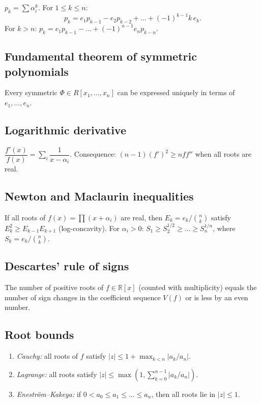 $p_k=\sum\alpha_i^k$. For $1\le k\le n$:
$$p_k=e_1 p_{k-1}-e_2 p_{k-2}+\dots+(-1)^{k-1}k\,e_k.$$
For $k>n$: $p_k=e_1 p_{k-1}-\dots+(-1)^{n-1}e_n p_{k-n}$.

\subsection{Fundamental theorem of symmetric polynomials}
\label{subsec:fundamental-symmetric}

Every symmetric $\Phi\in R[x_1,\dots,x_n]$ can be expressed uniquely in terms of $e_1,\dots,e_n$.

\subsection{Logarithmic derivative}
\label{subsec:log-derivative}

$\dfrac{f'(x)}{f(x)}=\sum_i\dfrac1{x-\alpha_i}$.
Consequence: $(n-1)(f')^2\ge n f f''$ when all roots are real.

\subsection{Newton and Maclaurin inequalities}
\label{subsec:newton-maclaurin}

If all roots of $f(x)=\prod(x+\alpha_i)$ are real, then $E_k=e_k/\binom{n}{k}$ satisfy $E_k^2\ge E_{k-1}E_{k+1}$ (log-concavity).
For $\alpha_i>0$: $S_1\ge S_2^{1/2}\ge\dots\ge S_n^{1/n}$, where $S_k=e_k/\binom{n}{k}$.

\subsection{Descartes' rule of signs}
\label{subsec:descartes}

The number of positive roots of $f\in\mathbb{R}[x]$ (counted with multiplicity) equals the number of sign changes in the coefficient sequence $V(f)$ or is less by an even number.

\subsection{Root bounds}
\label{subsec:root-bounds}

\begin{enumerate}
\item \textit{Cauchy:} all roots of $f$ satisfy $|z|\le 1+\max_{k<n}|a_k/a_n|$.
\item \textit{Lagrange:} all roots satisfy $|z|\le\max(1,\sum_{k=0}^{n-1}|a_k/a_n|)$.
\item \textit{Enestr\"om--Kakeya:} if $0<a_0\le a_1\le\dots\le a_n$, then all roots lie in $|z|\le 1$.
\end{enumerate}

